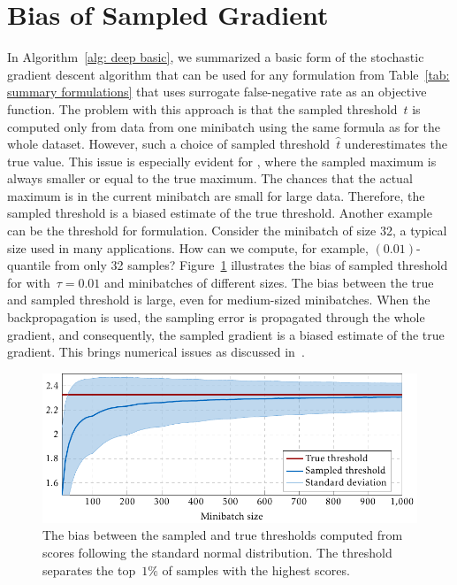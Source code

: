 \section{Bias of Sampled Gradient}\label{sec: bias sampled gradient}

In Algorithm~\ref{alg: deep basic}, we summarized a basic form of the stochastic gradient descent algorithm that can be used for any formulation from Table~\ref{tab: summary formulations} that uses surrogate false-negative rate as an objective function. The problem with this approach is that the sampled threshold~$\hat{t}$ is computed only from data from one minibatch using the same formula as for the whole dataset. However, such a choice of sampled threshold~$\hat{t}$ underestimates the true value. This issue is especially evident for \TopPush, where the sampled maximum is always smaller or equal to the true maximum. The chances that the actual maximum is in the current minibatch are small for large data. Therefore, the sampled threshold is a biased estimate of the true threshold. Another example can be the threshold for \PatMat formulation. Consider the minibatch of size 32, a typical size used in many applications. How can we compute, for example, $(0.01)$-quantile from only 32 samples? Figure~\ref{fig:thresholds1} illustrates the bias of sampled threshold for \PatMat with~$\tau=0.01$ and minibatches of different sizes. The bias between the true and sampled threshold is large, even for medium-sized minibatches. When the backpropagation is used, the sampling error is propagated through the whole gradient, and consequently, the sampled gradient is a biased estimate of the true gradient. This brings numerical issues as discussed in~\cite{bottou2018optimization}.

\begin{figure}
  \centering
  \includegraphics{images/deep_threshold_bias.pdf}
  \caption{The bias between the sampled and true thresholds computed from scores following the standard normal distribution. The threshold separates the top~$1\%$ of samples with the highest scores.}
  \label{fig:thresholds1}
\end{figure}

